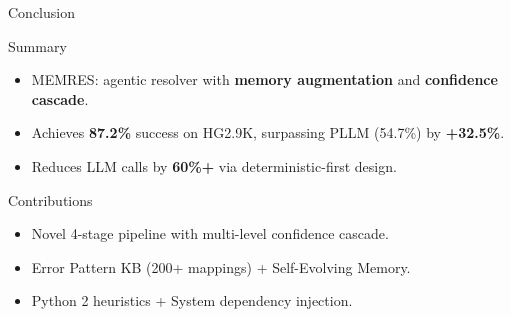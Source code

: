 \documentclass[aspectratio=169]{beamer}
\begin{document}
\begin{frame}{Conclusion}
\begin{block}{\faFlag\quad Summary}
\begin{itemize}
  \item MEMRES: agentic resolver with \textbf{memory augmentation} and \textbf{confidence cascade}.
  \item Achieves \textbf{87.2\%} success on HG2.9K, surpassing PLLM (54.7\%) by \textbf{+32.5\%}.
  \item Reduces LLM calls by \textbf{60\%+} via deterministic-first design.
\end{itemize}
\end{block}

\vspace{0.4em}
\begin{exampleblock}{\faStar\quad Contributions}
\begin{itemize}
  \item Novel 4-stage pipeline with multi-level confidence cascade.
  \item Error Pattern KB (200+ mappings) + Self-Evolving Memory.
  \item Python 2 heuristics + System dependency injection.
\end{itemize}
\end{exampleblock}

\vspace{0.4em}
\begin{center}
\end{center}
\end{frame}
\end{document}

